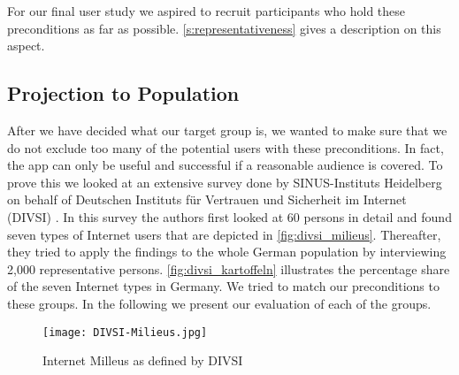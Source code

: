 For our final user study we aspired to recruit participants who hold these preconditions as far as possible.
\autoref{s:representativeness} gives a description on this aspect.

\subsection{Projection to Population}
After we have decided what our target group is, we wanted to make sure that we do not exclude too many of the potential users with these preconditions.
In fact, the app can only be useful and successful if a reasonable audience is covered.
To prove this we looked at an extensive survey done by SINUS-Instituts Heidelberg on behalf of Deutschen Instituts f\"{u}r Vertrauen und Sicherheit im Internet (DIVSI) \cite{divsi2012divsi}.
In this survey the authors first looked at 60 persons in detail and found seven types of Internet users that are depicted in \autoref{fig:divsi_milieus}.
Thereafter, they tried to apply the findings to the whole German population by interviewing 2,000 representative persons.
\autoref{fig:divsi_kartoffeln} illustrates the percentage share of the seven Internet types in Germany.
We tried to match our preconditions to these groups. In the following we present our evaluation of each of the groups.

\begin{figure}[hHtbp]
\centering
\texttt{[image: DIVSI-Milieus.jpg]}
\caption{Internet Milleus as defined by DIVSI \cite{divsi2012divsi}}
\label{fig:divsi_milieus}
\end{figure}

